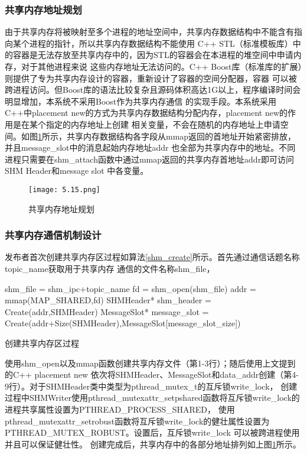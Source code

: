 \subsubsection{共享内存地址规划}
由于共享内存将被映射至多个进程的地址空间中，共享内存数据结构中不能含有指向某个进程的指针，所以共享内存数据结构不能使用
C++ STL（标准模板库）中的容器是无法存放至共享内存中的，因为STL的容器会在本进程的堆空间中申请内存，对于其他进程来说
这些内存地址无法访问的。C++ Boost库（标准库的扩展）则提供了专为共享内存设计的容器，重新设计了容器的空间分配器，容器
可以被跨进程访问。但Boost库的语法比较复杂且源码体积高达1G以上，程序编译时间会明显增加，本系统不采用Boost作为共享内存通信
的实现手段。本系统采用C++中placement new的方式为共享内存数据结构分配内存，placement new的作用是在某个指定的内存地址上创建
相关变量，不会在随机的内存地址上申请空间。如图\ref{shm_addr_design}所示，共享内存数据结构各字段从mmap返回的首地址开始紧密排放，并且message\_slot中的消息起始内存地址addr
也全部为共享内存中的地址。不同进程只需要在shm\_attach函数中通过mmap返回的共享内存首地址addr即可访问SHM Header和message slot
中各变量。
\begin{figure}[H]
  \centering
  \texttt{[image: 5.15.png]}
  \caption{共享内存地址规划}
  \label{shm_addr_design}
\end{figure}

\subsubsection{共享内存通信机制设计}
发布者首次创建共享内存区过程如算法\ref{shm_create}所示。首先通过通信话题名称topic\_name获取用于共享内存
通信的文件名称shm\_file，
\begin{algorithm}
  \small
  \SetAlgoLined
  shm\_file = shm\_ipc+topic\_name\;
  fd = shm\_open(shm\_file)\;
  addr = mmap(MAP\_SHARED,fd)\;
  SHMHeader* shm\_header = Create(addr,SHMHeader)\;
  MessageSlot* message\_slot = Create(addr+Size(SHMHeader),MessageSlot[message\_slot\_size])\;
  \caption{创建共享内存区过程}
  \label{shm_create}
\end{algorithm}
使用shm\_open以及mmap函数创建共享内存文件（第1-3行）；随后使用上文提到的C++ placement new
依次将SHMHeader、MessageSlot和data\_addr创建（第4-9行）。对于SHMHeader类中类型为pthread\_mutex\_t的互斥锁write\_lock，
创建过程中SHMWriter使用pthread\_mutexattr\_setpshared函数将互斥锁write\_lock的进程共享属性设置为PTHREAD\_PROCESS\_SHARED，
使用pthread\_mutexattr\_setrobust函数将互斥锁write\_lock的健壮属性设置为PTHREAD\_MUTEX\_ROBUST。设置后，互斥锁write\_lock
可以被跨进程使用并且可以保证健壮性。
创建完成后，共享内存中的各部分地址排列如上图\ref{shm_addr_design}所示。

